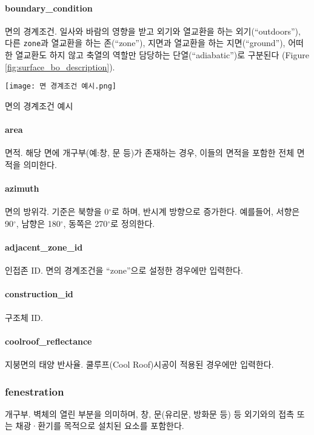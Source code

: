 \paragraph{boundary\_condition} 면의 경계조건. 일사와 바람의 영향을 받고 외기와 열교환을 하는 외기(``outdoors''), 다른 \texttt{zone}과 열교환을 하는 존(``zone''), 지면과 열교환을 하는 지면(``ground''), 어떠한 열교환도 하지 않고 축열의 역할만 담당하는 단열(``adiabatic'')로 구분된다 (Figure \ref{fig:surface_bo_description}).

\begin{defaultfigure}
  \texttt{[image: 면 경계조건 예시.png]}
  \caption{면의 경계조건 예시}
  \label{fig:surface_bo_description}
\end{defaultfigure}

\paragraph{area} 면적. 해당 면에 개구부(예:창, 문 등)가 존재하는 경우, 이들의 면적을 포함한 전체 면적을 의미한다.

\paragraph{azimuth} 면의 방위각. 기준은 북향을 0$^\circ$로 하며, 반시계 방향으로 증가한다. 예를들어, 서향은 90$^\circ$, 남향은 180$^\circ$, 동쪽은 270$^\circ$로 정의한다.

\paragraph{adjacent\_zone\_id} 인접존 ID. 면의 경계조건을 ``zone''으로 설정한 경우에만 입력한다.

\paragraph{construction\_id} 구조체 ID. 

\paragraph{coolroof\_reflectance} 지붕면의 태양 반사율. 쿨루프(Cool Roof)시공이 적용된 경우에만 입력한다.

\subsubsection{fenestration} \label{subsubsection:ioref:fenestration}
개구부. 벽체의 열린 부분을 의미하며, 창, 문(유리문, 방화문 등) 등 외기와의 접촉 또는 채광·환기를 목적으로 설치된 요소를 포함한다.

